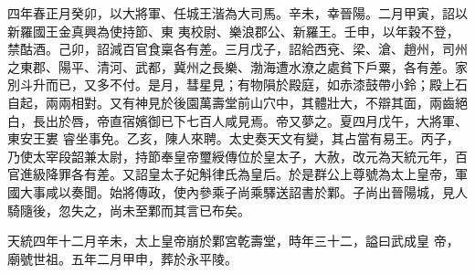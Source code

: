 \begin{pinyinscope}
 四年春正月癸卯，以大將軍、任城王湝為大司馬。辛未，幸晉陽。二月甲寅，詔以新羅國王金真興為使持節、東
 夷校尉、樂浪郡公、新羅王。壬申，以年穀不登，禁酤酒。己卯，詔減百官食稟各有差。三月戊子，詔給西兗、梁、滄、趙州，司州之東郡、陽平、清河、武都，冀州之長樂、渤海遭水潦之處貧下戶粟，各有差。家別斗升而已，又多不付。是月，彗星見；有物隕於殿庭，如赤漆鼓帶小鈴；殿上石自起，兩兩相對。又有神見於後園萬壽堂前山穴中，其體壯大，不辯其面，兩齒絕白，長出於唇，帝直宿嬪御已下七百人咸見焉。帝又夢之。夏四月戊午，大將軍、東安王婁
 睿坐事免。乙亥，陳人來聘。太史奏天文有變，其占當有易王。丙子，乃使太宰段韶兼太尉，持節奉皇帝璽綬傳位於皇太子，大赦，改元為天統元年，百官進級降罪各有差。又詔皇太子妃斛律氏為皇后。於是群公上尊號為太上皇帝，軍國大事咸以奏聞。始將傳政，使內參乘子尚乘驛送詔書於鄴。子尚出晉陽城，見人騎隨後，忽失之，尚未至鄴而其言已布矣。



 天統四年十二月辛未，太上皇帝崩於鄴宮乾壽堂，時年三十二，謚曰武成皇
 帝，廟號世祖。五年二月甲申，葬於永平陵。



\end{pinyinscope}